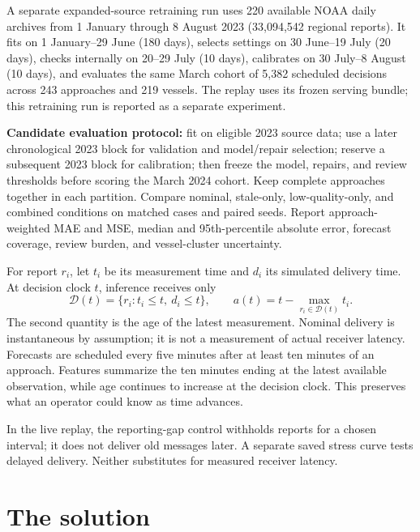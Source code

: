 \documentclass[11pt]{article}
\begin{document}
A separate expanded-source retraining run uses 220 available NOAA daily archives from 1 January through 8 August 2023 (33,094,542 regional reports). It fits on 1 January--29 June (180 days), selects settings on 30 June--19 July (20 days), checks internally on 20--29 July (10 days), calibrates on 30 July--8 August (10 days), and evaluates the same March cohort of 5,382 scheduled decisions across 243 approaches and 219 vessels. The replay uses its frozen serving bundle; this retraining run is reported as a separate experiment.

\textbf{Candidate evaluation protocol:} fit on eligible 2023 source data; use a later chronological 2023 block for validation and model/repair selection; reserve a subsequent 2023 block for calibration; then freeze the model, repairs, and review thresholds before scoring the March 2024 cohort. Keep complete approaches together in each partition. Compare nominal, stale-only, low-quality-only, and combined conditions on matched cases and paired seeds. Report approach-weighted MAE and MSE, median and 95th-percentile absolute error, forecast coverage, review burden, and vessel-cluster uncertainty.\par


For report $r_i$, let $t_i$ be its measurement time and $d_i$ its simulated delivery time. At decision clock $t$, inference receives only
\[
 \mathcal D(t)=\{r_i:t_i\leq t,\ d_i\leq t\},\qquad
 a(t)=t-\max_{r_i\in\mathcal D(t)}t_i.
\]
The second quantity is the age of the latest measurement. Nominal delivery is instantaneous by assumption; it is not a measurement of actual receiver latency. Forecasts are scheduled every five minutes after at least ten minutes of an approach. Features summarize the ten minutes ending at the latest available observation, while age continues to increase at the decision clock. This preserves what an operator could know as time advances.

In the live replay, the reporting-gap control withholds reports for a chosen interval; it does not deliver old messages later. A separate saved stress curve tests delayed delivery. Neither substitutes for measured receiver latency.

\section{The solution}
\end{document}

